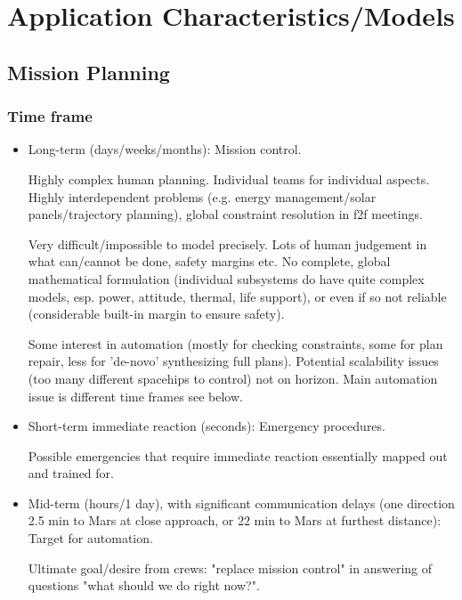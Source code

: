 \section{Application Characteristics/Models}

\subsection{Mission Planning}

\subsubsection{Time frame}

\begin{itemize}
\item Long-term (days/weeks/months): Mission control. 

    Highly complex human planning. Individual teams for individual aspects. Highly interdependent problems (e.g. energy management/solar panels/trajectory planning), global constraint resolution in f2f meetings. 
    
    Very difficult/impossible to model precisely. Lots of human judgement in what can/cannot be done, safety margins etc. No complete, global mathematical formulation (individual subsystems do have quite complex models, esp. power, attitude, thermal, life support), or even if so not reliable (considerable built-in margin to ensure safety).
    
    Some interest in automation (mostly for checking constraints, some for plan repair, less for 'de-novo' synthesizing full plans). Potential scalability issues (too many different spacehips to control) not on horizon. Main automation issue is different time frames see below.
    
\item Short-term immediate reaction (seconds): Emergency procedures.

    Possible emergencies that require immediate reaction essentially mapped out and trained for.

\item Mid-term (hours/1 day), with significant communication delays (one direction 2.5 min to Mars at close approach, or 22 min to Mars at furthest distance): Target for automation.

    Ultimate goal/desire from crews: "replace mission control" in answering of questions "what should we do right now?".
    
\end{itemize}


